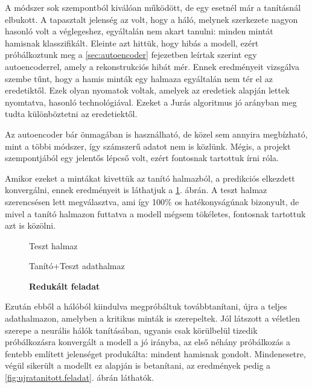 A módszer sok szempontból kiválóan működött, de egy esetnél már a tanításnál elbukott. 
A tapasztalt jelenség az volt, hogy a háló, melynek szerkezete nagyon hasonló volt 
a véglegeshez, egyáltalán nem akart tanulni: minden mintát hamisnak klasszifikált.
Eleinte azt hittük, hogy hibás a modell, ezért próbálkoztunk meg a \ref{sec:autoencoder}
fejezetben leírtak szerint egy autoencoderrel, amely a rekonstrukciós hibát mér.
Ennek eredményeit vizsgálva szembe tűnt, hogy a hamis minták egy halmaza egyáltalán nem 
tér el az eredetiktől. Ezek olyan nyomatok voltak, amelyek az eredetiek alapján 
lettek nyomtatva, hasonló technológiával. Ezeket a Jurás algoritmus jó arányban meg tudta 
különböztetni az eredetiektől.


Az autoencoder bár önmagában is használható, de közel sem annyira megbízható, mint a többi 
módszer, így számszerű adatot nem is közlünk. Mégis, a projekt szempontjából egy jelentős lépcső volt, ezért fontosnak tartottuk írni róla.


Amikor ezeket a mintákat kivettük az tanító halmazból, a predikciós elkezdett konvergálni,
ennek eredményeit is láthatjuk a \ref{fig:redukalt.feladat}. ábrán. A teszt halmaz szerencsésen
lett megválasztva, ami így 100\% os hatékonyságúnak bizonyult, de mivel a tanító halmazon 
futtatva a modell mégsem tökéletes, fontosnak tartottuk azt is közölni. 



\begin{figure}[ht]
	

	\begin{minipage}[c]{0.5\linewidth}
		
		\caption{Teszt halmaz}\label{fig:roc-test}

	\end{minipage}\hfill
	\begin{minipage}[c]{0.5\linewidth}
		
		\caption{Tanító+Teszt adathalmaz}\label{fig:roc-full}
		
	\end{minipage}
	\caption{\textbf{Redukált feladat}}
	\label{fig:redukalt.feladat}
\end{figure}


Ezután ebből a hálóból kiindulva megpróbáltuk továbbtanítani, újra a teljes adathalmazon,
amelyben a kritikus minták is szerepeltek. Jól látszott a véletlen szerepe a neurális 
hálók tanításában, ugyanis csak körülbelül tizedik próbálkozásra konvergált a modell a
jó irányba, az első néhány próbálkozás a fentebb említett jelenséget produkálta: mindent 
hamisnak gondolt. Mindenesetre, végül sikerült a modellt ez alapján is betanítani, az 
eredmények pedig a \ref{fig:ujratanitott.feladat}. ábrán láthatók.


